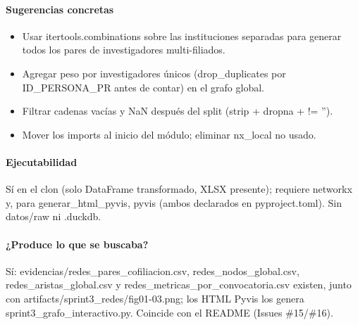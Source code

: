 \paragraph{Sugerencias concretas}
\begin{itemize}
  \item Usar itertools.combinations sobre las instituciones separadas para generar todos los pares de investigadores multi-filiados.
  \item Agregar peso por investigadores únicos (drop\_duplicates por ID\_PERSONA\_PR antes de contar) en el grafo global.
  \item Filtrar cadenas vacías y NaN después del split (strip + dropna + != '').
  \item Mover los imports al inicio del módulo; eliminar nx\_local no usado.
\end{itemize}

\paragraph{Ejecutabilidad}
Sí en el clon (solo DataFrame transformado, XLSX presente); requiere networkx y, para generar\_html\_pyvis, pyvis (ambos declarados en pyproject.toml). Sin datos/raw ni .duckdb.

\paragraph{¿Produce lo que se buscaba?}
Sí: evidencias/redes\_pares\_cofiliacion.csv, redes\_nodos\_global.csv, redes\_aristas\_global.csv y redes\_metricas\_por\_convocatoria.csv existen, junto con artifacts/sprint3\_redes/fig01-03.png; los HTML Pyvis los genera sprint3\_grafo\_interactivo.py. Coincide con el README (Issues \#15/\#16).

